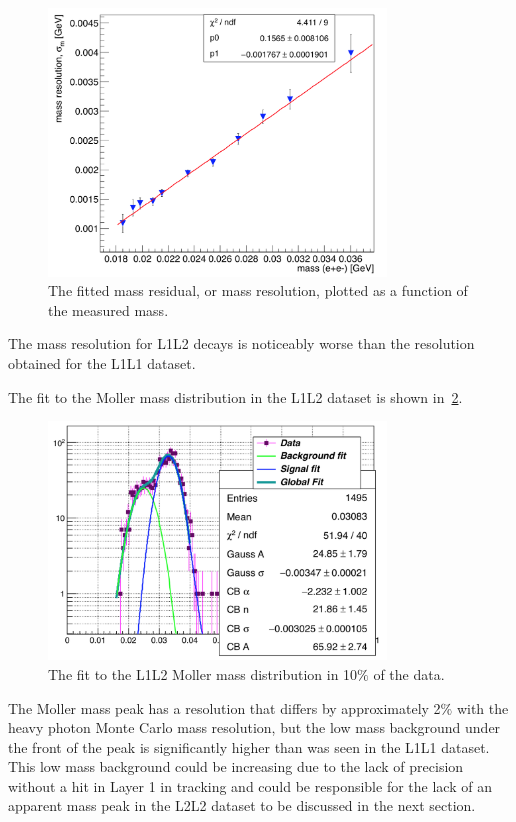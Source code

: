 \begin{figure}[H]
  \centering
      \includegraphics[width=0.8\textwidth]{plots/massRes_L1L2.png}
  \caption{The fitted mass residual, or mass resolution, plotted as a function of the measured mass.}
  \label{fig:massRes_l1l2}
\end{figure} 

The mass resolution for L1L2 decays is noticeably worse than the resolution obtained for the L1L1 dataset.

The fit to the Moller mass distribution in the L1L2 dataset is shown in~\ref{fig:mollerL1L2}.

\begin{figure}[H]
  \centering
      \includegraphics[width=0.8\textwidth]{plots/MollerMassL1L2_data.png}
  \caption{The fit to the L1L2 Moller mass distribution in 10$\%$ of the data.}
  \label{fig:mollerL1L2}
\end{figure} 

The Moller mass peak has a resolution that differs by approximately 2$\%$ with the heavy photon Monte Carlo mass resolution, but the low mass background under the front of the peak is significantly higher than was seen in the L1L1 dataset. This low mass background could be increasing due to the lack of precision without a hit in Layer 1 in tracking and could be responsible for the lack of an apparent mass peak in the L2L2 dataset to be discussed in the next section.


